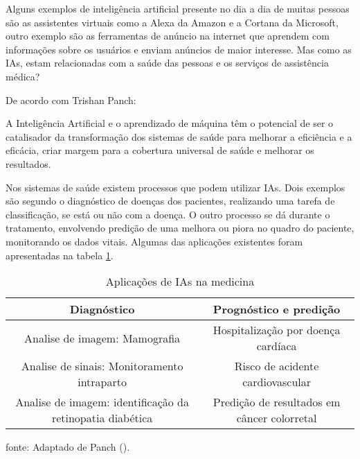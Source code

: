 \documentclass[
  12pt,		%
  a4paper,	%
  openright,%
  oneside,	%
  chapter=TITLE,		%
  section=TITLE,		%
  english,	%
  french,	%
  spanish,	%
  brazil	%
]{abntex2}
\begin{document}
    Alguns exemplos de inteligência artificial presente no dia a dia de muitas pessoas são as assistentes virtuais
    como a Alexa da Amazon e a Cortana da Microsoft, outro exemplo são as ferramentas de anúncio na internet que aprendem
    com informações sobre os usuários e enviam anúncios de maior interesse. Mas como as IAs, estam relacionadas 
    com a saúde das pessoas e os serviços de assistência médica?
    
    De acordo com Trishan Panch: 
    \vspace{1.5pt}
            \begin{flushright}
                \begin{minipage}{.724\textwidth}
                    {\SingleSpacing\small
                    A Inteligência Artificial e o aprendizado de máquina têm o potencial de ser o catalisador da transformação
dos sistemas de saúde para melhorar a eficiência e a eficácia, criar margem
para a cobertura universal de saúde e melhorar os resultados. \cite[p.1]{IA_health_systems}
                    }
                \end{minipage}
            \end{flushright}
            \vspace{1.5pt}

    Nos sistemas de saúde existem processos que podem utilizar IAs. Dois exemplos são segundo \cite[]{IA_health_systems}
    o diagnóstico de doenças dos pacientes, realizando uma tarefa de classificação, se está ou não com a doença. O outro processo
    se dá durante o tratamento, envolvendo predição de uma melhora ou piora no quadro do paciente, monitorando os dados vitais. Algumas das
    aplicações existentes foram apresentadas na tabela \ref*{tabela aplicações IA Med}.

    \begin{table}[ht]
        \centering
        \caption{Aplicações de IAs na medicina}
        \label{tabela aplicações IA Med}
        \begin{tabular}{cc}
            \hline
            \multicolumn{1}{|c|}{Diagnóstico} & \multicolumn{1}{c|}{Prognóstico e predição}\\
            \hline
            Analise de imagem: Mamografia & Hospitalização por doença cardíaca\\
            Analise de sinais: Monitoramento intraparto & Risco de acidente cardiovascular\\
            Analise de imagem: identificação da retinopatia diabética& Predição de resultados em câncer colorretal\\
            \hline
        \end{tabular}
        \par
        {\small fonte: Adaptado de Panch (\citeyear{IA_health_systems}).}
    \end{table}
\end{document}

